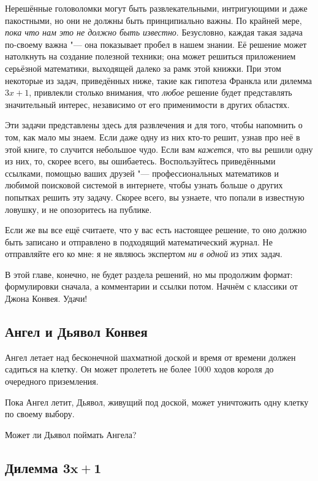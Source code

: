 \documentclass[twoside]{book}
\makeatletter
\newcommand{\rindex}[2][\imki@jobname]{%
  \index[#1]{\detokenize{#2}}%
}
\makeatother
\begin{document}
Нерешённые головоломки могут быть развлекательными, интригующими и даже пакостными,
но они не должны быть принципиально важны. 
По крайней мере, \emph{пока что нам это не должно быть известно}.
Безусловно, каждая такая задача по-своему важна "--- она показывает пробел в нашем знании.
Её решение может натолкнуть на создание полезной техники;
она может решиться приложением серьёзной математики, выходящей далеко за рамк этой книжки.
При этом некоторые из задач, приведённых ниже, такие как гипотеза Франкла или дилемма $3x+1$, привлекли столько внимания, что \emph{любое} решение будет представлять значительный интерес, независимо от его применимости в других областях.

Эти задачи представлены здесь для развлечения и для того, чтобы напомнить о том, как мало мы знаем.
Если даже одну из них кто-то решит, узнав про неё в этой книге, то случится небольшое чудо.
Если вам \emph{кажется}, что вы решили одну из них, то, скорее всего, вы ошибаетесь.
Воспользуйтесь приведёнными ссылками, помощью ваших друзей "--- профессиональных математиков и любимой поисковой системой в интернете, чтобы узнать больше о других попытках решить эту задачу.
Скорее всего, вы узнаете, что попали в известную ловушку, и не опозоритесь на публике.

Если же вы все ещё считаете, что у вас есть настоящее решение, то оно должно быть записано и отправлено в подходящий математический журнал.
Не отправляйте его ко мне: я не являюсь экспертом \emph{ни в одной} из этих задач.

\medskip

В этой главе, конечно, не будет раздела решений, но мы продолжим формат: формулировки сначала, а комментарии и ссылки потом.
Начнём с классики от Джона Конвея.
Удачи!


\subsection*{Ангел и Дьявол Конвея}
\rindex{Ангел и Дьявол Конвея}

Ангел летает над бесконечной шахматной доской и время от времени должен садиться на клетку.
Он может пролететь не более 1000 ходов короля до очередного приземления.

Пока Ангел летит, Дьявол, живущий под доской, может уничтожить одну клетку по своему выбору.

Может ли Дьявол поймать Ангела?

\subsection*{Дилемма $\bm{3x+1}$}
\rindex{Дилемма $3x+1$}
\end{document}
